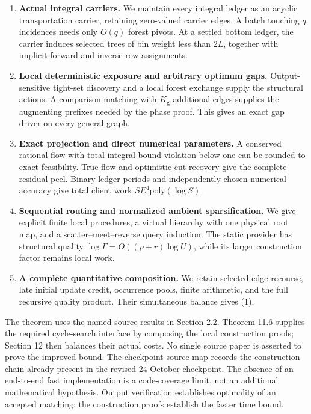 \begin{enumerate}
\def\labelenumi{\arabic{enumi}.}
\tightlist
\item
  \textbf{Actual integral carriers.} We maintain every integral ledger as an acyclic transportation carrier, retaining zero-valued carrier edges. A batch touching \(q\) incidences needs only \(O(q)\) forest pivots. At a settled bottom ledger, the carrier induces selected trees of bin weight less than \(2L\), together with implicit forward and inverse row assignments.
\item
  \textbf{Local deterministic exposure and arbitrary optimum gaps.} Output-sensitive tight-set discovery and a local forest exchange supply the structural actions. A comparison matching with \(K_{\mathrm g}\) additional edges supplies the augmenting prefixes needed by the phase proof. This gives an exact gap driver on every general graph.
\item
  \textbf{Exact projection and direct numerical parameters.} A conserved rational flow with total integral-bound violation below one can be rounded to exact feasibility. True-flow and optimistic-cut recovery give the complete residual peel. Binary ledger periods and independently chosen numerical accuracy give total client work \(S E^4\mathrm{poly}(\log S)\).
\item
  \textbf{Sequential routing and normalized ambient sparsification.} We give explicit finite local procedures, a virtual hierarchy with one physical root map, and a scatter--meet--reverse query induction. The static provider has structural quality \(\log\Gamma=O((p+r)\log U)\), while its larger construction factor remains local work.
\item
  \textbf{A complete quantitative composition.} We retain selected-edge recourse, late initial update credit, occurrence pools, finite arithmetic, and the full recursive quality product. Their simultaneous balance gives (1).
\end{enumerate}

The theorem uses the named source results in Section 2.2. Theorem 11.6 supplies the required cycle-search interface by composing the local construction proofs; Section 12 then balances their actual costs. No single source paper is asserted to prove the improved bound. The \href{https://github.com/icekylinx/algorithm-frontier/blob/main/problems/general-matching/sources.md\#checkpoint-provenance}{checkpoint source map} records the construction chain already present in the revised 24 October checkpoint. The absence of an end-to-end fast implementation is a code-coverage limit, not an additional mathematical hypothesis. Output verification establishes optimality of an accepted matching; the construction proofs establish the faster time bound.

